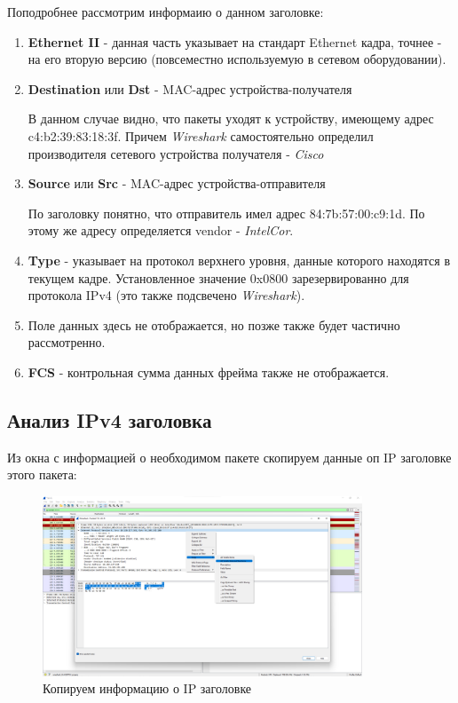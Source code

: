 \documentclass[a4paper]{article}
\begin{document}
  Поподробнее рассмотрим информаию о данном заголовке:
  \begin{enumerate}
    \item {
      \textbf{Ethernet II} - данная часть указывает на стандарт Ethernet кадра,
      точнее - на его вторую версию (повсеместно используемую в сетевом оборудовании).
    }
    \item {
      \textbf{Destination} или \textbf{Dst} - MAC-адрес устройства-получателя

      В данном случае видно, что пакеты уходят к устройству, имеющему
      адрес c4:b2:39:83:18:3f.
      Причем \textit{Wireshark} самостоятельно определил производителя сетевого 
      устройства получателя - \textit{Cisco}
    }
    \item {
      \textbf{Source} или \textbf{Src} - MAC-адрес устройства-отправителя

      По заголовку понятно, что отправитель имел адрес 84:7b:57:00:c9:1d.
      По этому же адресу определяется vendor - \textit{IntelCor}.
    }
    \item {
      \textbf{Type} - указывает на протокол верхнего уровня, данные которого 
      находятся в текущем кадре. Установленное значение 0x0800 зарезервированно
      для протокола IPv4 (это также подсвечено \textit{Wireshark}).
    }
    \item {
      Поле данных здесь не отображается, но позже также будет частично рассмотренно.
    }
    \item {
      \textbf{FCS} - контрольная сумма данных фрейма также не отображается.
    }
  \end{enumerate}

  \subsection{Анализ IPv4 заголовка}

  Из окна с информацией о необходимом пакете скопируем данные оп IP заголовке 
  этого пакета:
  
  \begin{figure}[H]
    \centering 
    \includegraphics[width=0.85\textwidth]{03_0007}
    \caption{Копируем информацию о IP заголовке}
    \label{img:0007}
  \end{figure}
\end{document}
